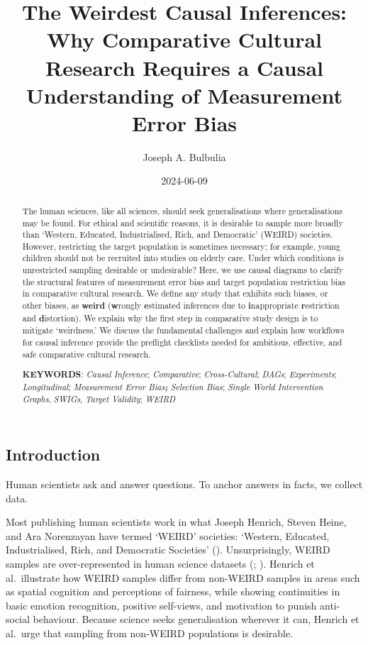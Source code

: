 \documentclass[
  single column]{article}
\title{The Weirdest Causal Inferences: Why Comparative Cultural Research
Requires a Causal Understanding of Measurement Error Bias}
\author{Joseph A. Bulbulia}
\affil{%
             \small{     Victoria University of Wellington, New Zealand
          ORCID \textcolor[HTML]{A6CE39}{\aiOrcid} ~0000-0002-5861-2056 }
              }
\date{2024-06-09}
\begin{document}
\maketitle
\begin{abstract}
The human sciences, like all sciences, should seek generalisations where
generalisations may be found. For ethical and scientific reasons, it is
desirable to sample more broadly than `Western, Educated,
Industrialised, Rich, and Democratic' (WEIRD) societies. However,
restricting the target population is sometimes necessary; for example,
young children should not be recruited into studies on elderly care.
Under which conditions is unrestricted sampling desirable or
undesirable? Here, we use causal diagrams to clarify the structural
features of measurement error bias and target population restriction
bias in comparative cultural research. We define any study that exhibits
such biases, or other biases, as \textbf{weird} (\textbf{w}rongly
\textbf{e}stimated inferences due to \textbf{i}nappropriate
\textbf{r}estriction and \textbf{d}istortion). We explain why the first
step in comparative study design is to mitigate `weirdness.' We discuss
the fundamental challenges and explain how workflows for causal
inference provide the preflight checklists needed for ambitious,
effective, and safe comparative cultural research.

\textbf{KEYWORDS}: \emph{Causal Inference}; \emph{Comparative};
\emph{Cross-Cultural}; \emph{DAGs}; \emph{Experiments};
\emph{Longitudinal}; \emph{Measurement Error Bias\textbf{; }Selection
Bias}; \emph{Single World Intervention Graphs}, \emph{SWIGs},
\emph{Target Validity}; \emph{WEIRD}
\end{abstract}

\subsection{Introduction}\label{id-sec-intro}

Human scientists ask and answer questions. To anchor answers in facts,
we collect data.

Most publishing human scientists work in what Joseph Henrich, Steven
Heine, and Ara Norenzayan have termed `WEIRD' societies: `Western,
Educated, Industrialised, Rich, and Democratic Societies'
().
Unsurprisingly, WEIRD samples are over-represented in human science
datasets (;
). Henrich et al.~illustrate
how WEIRD samples differ from non-WEIRD samples in areas such as spatial
cognition and perceptions of fairness, while showing continuities in
basic emotion recognition, positive self-views, and motivation to punish
anti-social behaviour. Because science seeks generalisation wherever it
can, Henrich et al.~urge that sampling from non-WEIRD populations is
desirable.
\end{document}
